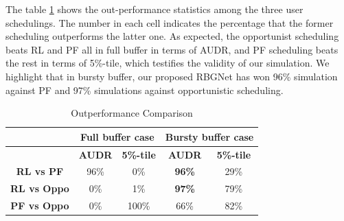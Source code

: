 \documentclass[conference,compsocconf]{IEEEtran}
\begin{document}
The table \ref{tb:2} shows the out-performance statistics among the three user schedulings. The number in each cell indicates the percentage that the former scheduling outperforms the latter one. As expected, the opportunist scheduling beats RL and PF all in full buffer in terms of AUDR, and PF scheduling beats the rest in terms of 5\%-tile, which testifies the validity of our simulation. We highlight that in bursty buffer, our proposed RBGNet has won 96\% simulation against PF and 97\% simulations against opportunistic scheduling.

\renewcommand\arraystretch{1.5}
\begin{table}[H]
	\caption{Outperformance Comparison} \label{tb:2}
	\centering
	\begin{tabular}{c|c|c|c|c}
		\hline
		\textbf{}           & \multicolumn{2}{c|}{\textbf{Full buffer case}} & \multicolumn{2}{c}{\textbf{Bursty buffer case}} \\ \hline
		\textbf{}           & \textbf{AUDR}      & \textbf{5\%-tile}      & \textbf{AUDR}    & \textbf{5\%-tile}   \\ \hline
		\textbf{RL vs PF}   & 96\%         & 0\%                    & \textbf{96\%}                & 29\%                \\ \hline
		\textbf{RL vs Oppo} & 0\%                   & 1\%                    & \textbf{97\%}       & 79\%                \\ \hline
		\textbf{PF vs Oppo} & 0\%                   & 100\%         & 66\%                & 82\%      \\ \hline
	\end{tabular}
\end{table}
\end{document}
